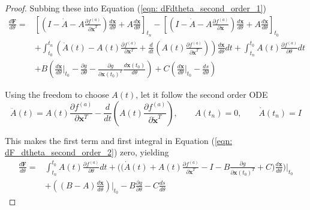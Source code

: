 \documentclass{article}
\theoremstyle{remark}
\theoremstyle{definition}
\begin{document}
\begin{proof}
Subbing these into Equation (\ref{eqn: dFdtheta_second_order_1})
\begin{equation}
\label{eqn: dF_dtheta_second_order_2}
\begin{aligned}
    \frac{d\mathbf{F}}{d\theta} = 
    &\left[
    \left( 
    I 
    -\dot{A}
    - A\frac{\partial f^{(a)}}{\partial \dot{\mathbf{x}}^{T}}
    \right)\frac{d\mathbf{x}}{d\theta}
    +A\frac{d\dot{\mathbf{x}}}{d\theta}
    \right]_{t_{n}}
    -\left[
    \left( 
    I 
    -\dot{A}
    - A\frac{\partial f^{(a)}}{\partial \dot{\mathbf{x}}}
    \right)\frac{d\mathbf{x}}{d\theta}
    +A\frac{d\dot{\mathbf{x}}}{d\theta}
    \right]_{t_{0}}\\
    & +\int_{t_{0}}^{t_{n}}\left(
    \ddot{A}(t) - A(t)\frac{\partial f^{(a)}}{\partial \mathbf{x}^{T}}
    +\frac{d}{dt}\left(
    A(t)\frac{\partial f^{(a)}}{\partial \dot{\mathbf{x}}^{T}}
    \right)
    \right)\frac{d\mathbf{x}}{d\theta}dt
    +\int_{t_{n}}^{t_{0}} A(t)\frac{\partial f^{(a)}}{\partial \theta}dt \\
    &+B\left(
    \frac{d\dot{\mathbf{x}}}{d\theta}\Biggr\vert_{t_{0}}- \frac{\partial g}{\partial \theta} - \frac{\partial g}{\partial \mathbf{x}(t_{0})^{T}}\frac{d\mathbf{x}(t_{0})}{d\theta}
    \right)
    + C\left(
    \frac{d\mathbf{x}}{d\theta}\Biggr\vert_{t_{0}} - \frac{ds}{d\theta}
    \right)
\end{aligned}
\end{equation}

Using the freedom to choose $A(t)$, let it follow the second order ODE
\begin{equation}
\label{eqn: lambda_ode_second_order}
    \ddot{A}(t) = A(t)\frac{\partial f^{(a)}}{\partial \mathbf{x}^{T}} - \frac{d}{dt}\left(
    A(t)\frac{\partial f^{(a)}}{\partial \dot{\mathbf{x}}^{T}}
    \right)
    ,\qquad
    A(t_{n}) = 0
    ,\qquad
    \dot{A}(t_{n}) = I
\end{equation}

This makes the first term and first integral in Equation (\ref{eqn: dF_dtheta_second_order_2}) zero, yielding 
\begin{equation}
\label{eqn: dFdtheta_second_order_3}
\begin{aligned}
    \frac{d\mathbf{F}}{d\theta} = 
&\int_{t_{n}}^{t_{0}}A(t)\frac{\partial f^{(a)}}{\partial \theta}dt
    +\Biggr(\Biggr(
    \dot{A}(t) + A(t)\frac{\partial f^{(a)}}{\partial \dot{\mathbf{x}}^{T}} - I
    - B
    \frac{\partial g}{\partial \mathbf{x}(t_{0})^{T}}
    + C
    \Biggr)\frac{d\mathbf{x}}{d\theta}
    \Biggr)\Biggr\vert_{t_{0}} \\
& +\left(\left(
    B - A\right)\frac{d\dot{\mathbf{x}}}{d\theta}
    \right)\Biggr\vert_{t_{0}}
    - B\frac{\partial g}{\partial \theta}
    - C\frac{d s}{d \theta}
\end{aligned}
\end{equation}


\end{proof}
\end{document}
